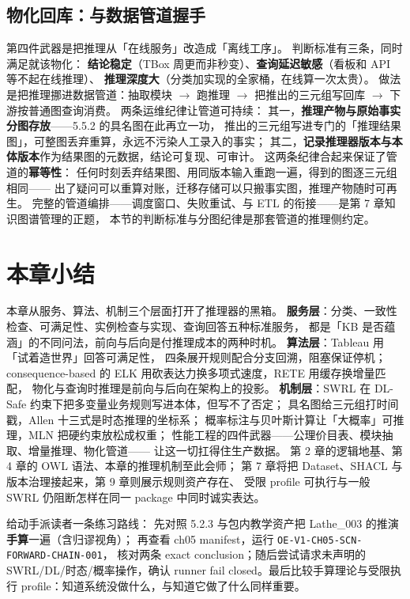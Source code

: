 \subsection{物化回库：与数据管道握手}

第四件武器是把推理从「在线服务」改造成「离线工序」。
判断标准有三条，同时满足就该物化：
\textbf{结论稳定}（TBox 周更而非秒变）、\textbf{查询延迟敏感}（看板和 API 等不起在线推理）、
\textbf{推理深度大}（分类加实现的全家桶，在线算一次太贵）。
做法是把推理挪进数据管道：抽取模块 \(\rightarrow\) 跑推理 \(\rightarrow\)
把推出的三元组写回库 \(\rightarrow\) 下游按普通图查询消费。
两条运维纪律让管道可持续：
其一，\textbf{推理产物与原始事实分图存放}——5.5.2 的具名图在此再立一功，
推出的三元组写进专门的「推理结果图」，可整图丢弃重算，永远不污染人工录入的事实；
其二，\textbf{记录推理器版本与本体版本}作为结果图的元数据，结论可复现、可审计。
这两条纪律合起来保证了管道的\textbf{幂等性}：
任何时刻丢弃结果图、用同版本输入重跑一遍，得到的图逐三元组相同——
出了疑问可以重算对账，迁移存储可以只搬事实图，推理产物随时可再生。
完整的管道编排——调度窗口、失败重试、与 ETL 的衔接——是第 7 章知识图谱管理的正题，
本节的判断标准与分图纪律是那套管道的推理侧约定。

\section{本章小结}

本章从服务、算法、机制三个层面打开了推理器的黑箱。
\textbf{服务层}：分类、一致性检查、可满足性、实例检查与实现、查询回答五种标准服务，
都是「KB 是否蕴涵」的不同问法，前向与后向是付推理成本的两种时机。
\textbf{算法层}：Tableau 用「试着造世界」回答可满足性，
四条展开规则配合分支回溯，阻塞保证停机；
consequence-based 的 ELK 用砍表达力换多项式速度，RETE 用缓存换增量匹配，
物化与查询时推理是前向与后向在架构上的投影。
\textbf{机制层}：SWRL 在 DL-Safe 约束下把多变量业务规则写进本体，但写不了否定；
具名图给三元组打时间戳，Allen 十三式是时态推理的坐标系；
概率标注与贝叶斯计算让「大概率」可推理，MLN 把硬约束放松成权重；
性能工程的四件武器——公理价目表、模块抽取、增量推理、物化管道——
让这一切扛得住生产数据。
第 2 章的逻辑地基、第 4 章的 OWL 语法、本章的推理机制至此会师；
第 7 章将把 Dataset、SHACL 与版本治理接起来，第 9 章则展示规则资产存在、
受限 profile 可执行与一般 SWRL 仍阻断怎样在同一 package 中同时诚实表达。

给动手派读者一条练习路线：
先对照 5.2.3 与包内教学资产把 Lathe\_003 的推演\textbf{手算}一遍（含归谬视角）；
再查看 ch05 manifest，运行 \texttt{OE-V1-CH05-SCN-FORWARD-CHAIN-001}，
核对两条 exact conclusion；随后尝试请求未声明的 SWRL/DL/时态/概率操作，确认 runner
fail closed。最后比较手算理论与受限执行 profile：知道系统没做什么，与知道它做了什么同样重要。

